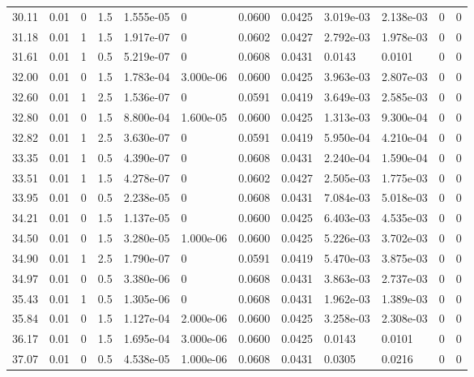 \documentclass[preview]{standalone}
\begin{document}
{{{\begin{tabular}{L{1.2cm}C{1.2cm} C{0.3cm}C{0.5cm} C{1.4cm}C{1.4cm} C{1.4cm}C{1.4cm} C{1.6cm}C{1.6cm} C{1.6cm}C{1.6cm}}
  30.11  &  0.01  & 0     & 1.5 &  1.555e-05  & 0  &  0.0600&   0.0425& 3.019e-03 & 2.138e-03   &  0 & 0  \\ 
  31.18  &  0.01  & 1     & 1.5 &  1.917e-07  & 0  &  0.0602&   0.0427& 2.792e-03 & 1.978e-03   &  0 & 0  \\ 
  31.61  &  0.01  & 1     & 0.5 &  5.219e-07  & 0  &  0.0608&   0.0431& 0.0143 & 0.0101   &  0 & 0  \\ 
  32.00  &  0.01  & 0     & 1.5 &  1.783e-04  & 3.000e-06  &  0.0600&   0.0425& 3.963e-03 & 2.807e-03   &  0 & 0  \\ 
  32.60  &  0.01  & 1     & 2.5 &  1.536e-07  & 0  &  0.0591&   0.0419& 3.649e-03 & 2.585e-03   &  0 & 0  \\ 
  32.80  &  0.01  & 0     & 1.5 &  8.800e-04  & 1.600e-05  &  0.0600&   0.0425& 1.313e-03 & 9.300e-04   &  0 & 0  \\ 
  32.82  &  0.01  & 1     & 2.5 &  3.630e-07  & 0  &  0.0591&   0.0419& 5.950e-04 & 4.210e-04   &  0 & 0  \\ 
  33.35  &  0.01  & 1     & 0.5 &  4.390e-07  & 0  &  0.0608&   0.0431& 2.240e-04 & 1.590e-04   &  0 & 0  \\ 
  33.51  &  0.01  & 1     & 1.5 &  4.278e-07  & 0  &  0.0602&   0.0427& 2.505e-03 & 1.775e-03   &  0 & 0  \\ 
  33.95  &  0.01  & 0     & 0.5 &  2.238e-05  & 0  &  0.0608&   0.0431& 7.084e-03 & 5.018e-03   &  0 & 0  \\ 
  34.21  &  0.01  & 0     & 1.5 &  1.137e-05  & 0  &  0.0600&   0.0425& 6.403e-03 & 4.535e-03   &  0 & 0  \\ 
  34.50  &  0.01  & 0     & 1.5 &  3.280e-05  & 1.000e-06  &  0.0600&   0.0425& 5.226e-03 & 3.702e-03   &  0 & 0  \\ 
  34.90  &  0.01  & 1     & 2.5 &  1.790e-07  & 0  &  0.0591&   0.0419& 5.470e-03 & 3.875e-03   &  0 & 0  \\ 
  34.97  &  0.01  & 0     & 0.5 &  3.380e-06  & 0  &  0.0608&   0.0431& 3.863e-03 & 2.737e-03   &  0 & 0  \\ 
  35.43  &  0.01  & 1     & 0.5 &  1.305e-06  & 0  &  0.0608&   0.0431& 1.962e-03 & 1.389e-03   &  0 & 0  \\ 
  35.84  &  0.01  & 0     & 1.5 &  1.127e-04  & 2.000e-06  &  0.0600&   0.0425& 3.258e-03 & 2.308e-03   &  0 & 0  \\ 
  36.17  &  0.01  & 0     & 1.5 &  1.695e-04  & 3.000e-06  &  0.0600&   0.0425& 0.0143 & 0.0101   &  0 & 0  \\ 
  37.07  &  0.01  & 0     & 0.5 &  4.538e-05  & 1.000e-06  &  0.0608&   0.0431& 0.0305 & 0.0216   &  0 & 0  \\ 

\end{tabular}}}}
\end{document}
